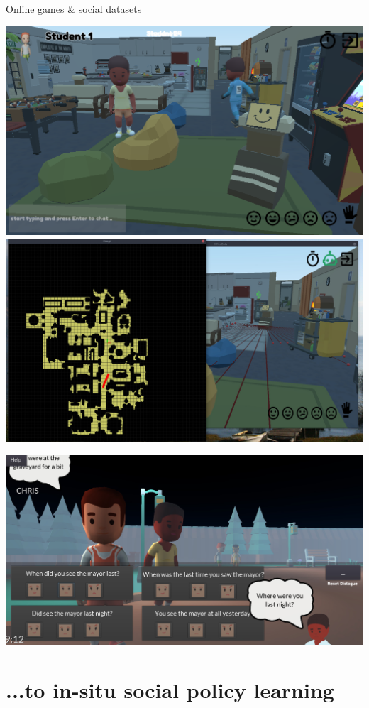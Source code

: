 \documentclass[xcolor=table]{beamer}
\begin{document}
\begin{frame}{Online games \& social datasets}
    \begin{center}
        \includegraphics[width=0.45\linewidth]{figs/online-game/officebots-screenshot-2.png}
        \includegraphics[width=0.45\linewidth]{figs/online-game/officebots-map.jpg}
    \end{center}

    \begin{center}
        \includegraphics[width=0.6\linewidth]{figs/online-game/graveyard-detective-screenshot.jpg}
    \end{center}



\end{frame}




\section[Social policy learning]{...to in-situ social policy learning}


\end{document}
